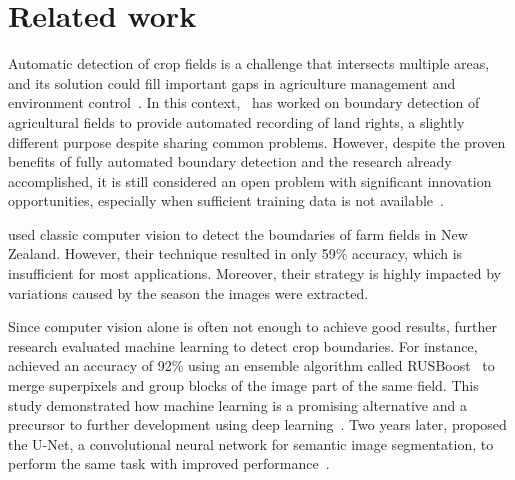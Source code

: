 \documentclass[12pt]{article}
\begin{document}
\section{Related work}\label{section:bibliografia}

Automatic detection of crop fields is a challenge that intersects multiple areas, and its solution could fill important gaps in agriculture management and environment control~\citep{bolfe2020}. In this context,~\citet{crommelinck2019} has worked on boundary detection of agricultural fields to provide automated recording of land rights, a slightly different purpose despite sharing common problems. However, despite the proven benefits of fully automated boundary detection and the research already accomplished, it is still considered an open problem with significant innovation opportunities, especially when sufficient training data is not available~\citep{waldner2021,yang2020}.

\citet{north2019} used classic computer vision to detect the boundaries of farm fields in New Zealand. However, their technique resulted in only 59\% accuracy, which is insufficient for most applications. Moreover, their strategy is highly impacted by variations caused by the season the images were extracted.


Since computer vision alone is often not enough to achieve good results, further research evaluated machine learning to detect crop boundaries. For instance, \citet{garcia2017} achieved an accuracy of 92\% using an ensemble algorithm called RUSBoost~\citep{seiffert2010} to merge superpixels and group blocks of the image part of the same field. This study demonstrated how machine learning is a promising alternative and a precursor to further development using deep learning~\citep{garcia2017}. Two years later, \citet{garcia2019} proposed the U-Net, a convolutional neural network for semantic image segmentation, to perform the same task with improved performance~\cite{garcia2017,garcia2018,garcia2019}.
\end{document}
